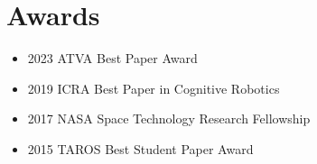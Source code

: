 \section{Awards}

\vspace{6pt}

\begin{itemize}

\item[]{2023 ATVA Best Paper Award}

\vspace{6pt}

\item[]{2019 ICRA Best Paper in Cognitive Robotics}

\vspace{6pt}

\item[]{2017 NASA Space Technology Research Fellowship}



\vspace{6pt}

\item[]{2015 TAROS Best Student Paper Award}







\end{itemize}